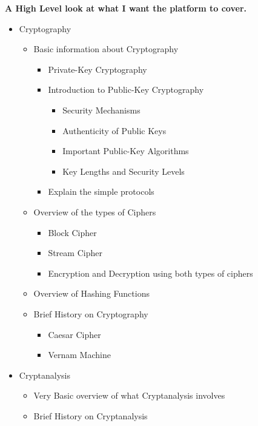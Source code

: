 \textbf{A High Level look at what I want the platform to cover.}
\begin{itemize}
\item{Cryptography
\begin{itemize}
\item{Basic information about Cryptography
\begin{itemize} %
\item{Private-Key Cryptography}
\item{Introduction to Public-Key Cryptography
\begin{itemize}
\item{Security Mechanisms}
\item{Authenticity of Public Keys}
\item{Important Public-Key Algorithms}
\item{Key Lengths and Security Levels}
\end{itemize}}
\item{Explain the simple protocols}
\end{itemize}}
\item{Overview of the types of Ciphers
\begin{itemize}
\item{Block Cipher}
\item{Stream Cipher}
\item{Encryption and Decryption using both types of ciphers}
\end{itemize}}
\item{Overview of Hashing Functions}
\item{Brief History on Cryptography
\begin{itemize}
\item{Caesar Cipher}
\item{Vernam Machine}
\end{itemize}}
\end{itemize}}
\item{Cryptanalysis
\begin{itemize}
\item{Very Basic overview of what Cryptanalysis involves}
\item{Brief History on Cryptanalysis}
\end{itemize}}
\end{itemize}

